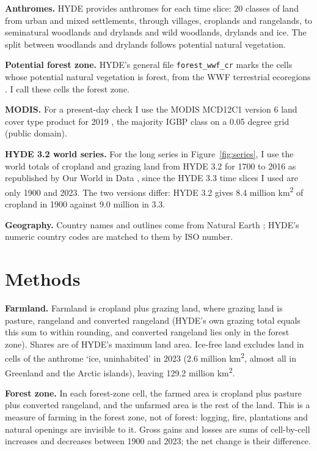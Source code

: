 \documentclass[11pt,a4paper]{article}
\begin{document}
\textbf{Anthromes.} HYDE provides anthromes \citep{ellis2010,ellis2021} for each time slice: 20 classes of land from urban and mixed settlements, through villages, croplands and rangelands, to seminatural woodlands and drylands and wild woodlands, drylands and ice. The split between woodlands and drylands follows potential natural vegetation.

\textbf{Potential forest zone.} HYDE's general file \texttt{forest\_wwf\_cr} marks the cells whose potential natural vegetation is forest, from the WWF terrestrial ecoregions \citep{olson}. I call these cells the forest zone.

\textbf{MODIS.} For a present-day check I use the MODIS MCD12C1 version 6 land cover type product for 2019 \citep{modis}, the majority IGBP class on a 0.05 degree grid (public domain).

\textbf{HYDE 3.2 world series.} For the long series in Figure~\ref{fig:series}, I use the world totals of cropland and grazing land from HYDE 3.2 for 1700 to 2016 as republished by Our World in Data \citep{owid}, since the HYDE 3.3 time slices I used are only 1900 and 2023. The two versions differ: HYDE 3.2 gives 8.4 million km\textsuperscript{2} of cropland in 1900 against 9.0 million in 3.3.

\textbf{Geography.} Country names and outlines come from Natural Earth \citep{naturalearth}; HYDE's numeric country codes are matched to them by ISO number.

\section{Methods}
\textbf{Farmland.} Farmland is cropland plus grazing land, where grazing land is pasture, rangeland and converted rangeland (HYDE's own grazing total equals this sum to within rounding, and converted rangeland lies only in the forest zone). Shares are of HYDE's maximum land area. Ice-free land excludes land in cells of the anthrome `ice, uninhabited' in 2023 (2.6 million km\textsuperscript{2}, almost all in Greenland and the Arctic islands), leaving 129.2 million km\textsuperscript{2}.

\textbf{Forest zone.} In each forest-zone cell, the farmed area is cropland plus pasture plus converted rangeland, and the unfarmed area is the rest of the land. This is a measure of farming in the forest zone, not of forest: logging, fire, plantations and natural openings are invisible to it. Gross gains and losses are sums of cell-by-cell increases and decreases between 1900 and 2023; the net change is their difference.
\end{document}
